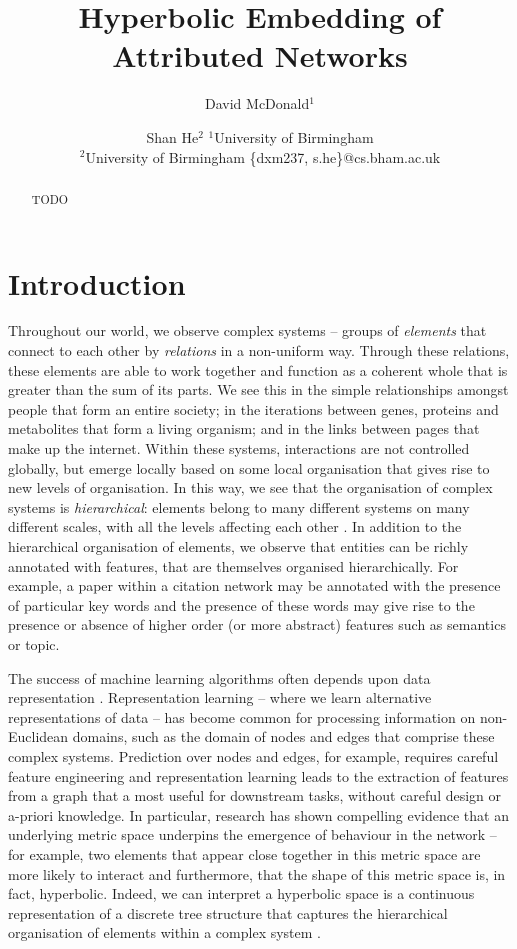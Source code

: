 \documentclass{article}
\title{Hyperbolic Embedding of Attributed Networks}
\author{
	David McDonald$^1$
	\and
	Shan He$^2$
	\affiliations
	$^1$University of Birmingham\\
	$^2$University of Birmingham
	\emails
	\{dxm237, s.he\}@cs.bham.ac.uk
}
\begin{document}
	
	\maketitle
	
	\begin{abstract}
		TODO
	\end{abstract}
	
	\section{Introduction}
	
	
	Throughout our world, we observe complex systems -- groups of \textit{elements} that connect to each other by \textit{relations} in a non-uniform way. 
	Through these relations, these elements are able to work together and function as a coherent whole that is greater than the sum of its parts.
	We see this in the simple relationships amongst people that form an entire society; in the iterations between genes, proteins and metabolites that form a living organism; and in the links between pages that make up the internet.
	Within these systems, interactions are not controlled globally, but emerge locally based on some local organisation that gives rise to new levels of organisation.
	In this way, we see that the organisation of complex systems is \textit{hierarchical}: elements belong to many different systems on many different scales, with all the levels affecting each other \cite{barabasi1999emergence}.   
	In addition to the hierarchical organisation of elements, we observe that entities can be richly annotated with features, that are themselves organised hierarchically.  
	For example, a paper within a citation network may be annotated with the presence of particular key words and the presence of these words may give rise to the presence or absence of higher order (or more abstract) features such as semantics or topic. 
	
	The success of machine learning algorithms often depends upon data representation \cite{bengio2013representation}.
	Representation learning -- where we learn alternative representations of data -- has become common for processing information on non-Euclidean domains, such as the domain of nodes and edges that comprise these complex systems.  
	Prediction over nodes and edges, for example, requires careful feature engineering \cite{grover2016node2vec} and representation learning leads to the extraction of features from a graph that a most useful for downstream tasks, without careful design or a-priori knowledge.
	In particular, research has shown compelling evidence that an underlying metric space underpins the emergence of behaviour in the network -- for example, two elements that appear close together in this metric space are more likely to interact \cite{grover2016node2vec,alanis2016efficient,alanis2016manifold} and furthermore, that the shape of this metric space is, in fact, hyperbolic.
	Indeed, we can interpret a hyperbolic space is a continuous representation of a discrete tree structure that captures the hierarchical organisation of elements within a complex system \cite{krioukov2010hyperbolic}.
	
\end{document}
